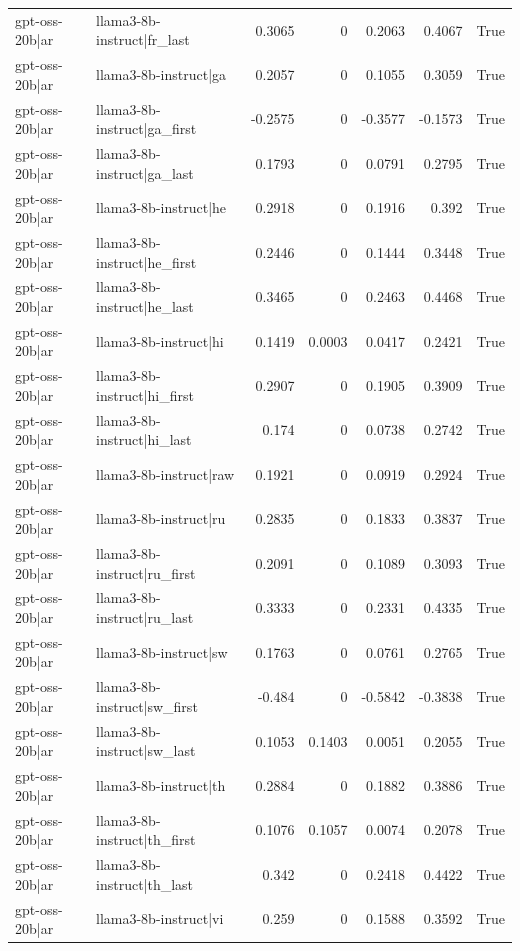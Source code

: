 \begin{table}
\begin{tabular}{l l r r r r l}
gpt-oss-20b|ar & llama3-8b-instruct|fr_last & 0.3065 & 0 & 0.2063 & 0.4067 & True \\
gpt-oss-20b|ar & llama3-8b-instruct|ga & 0.2057 & 0 & 0.1055 & 0.3059 & True \\
gpt-oss-20b|ar & llama3-8b-instruct|ga_first & -0.2575 & 0 & -0.3577 & -0.1573 & True \\
gpt-oss-20b|ar & llama3-8b-instruct|ga_last & 0.1793 & 0 & 0.0791 & 0.2795 & True \\
gpt-oss-20b|ar & llama3-8b-instruct|he & 0.2918 & 0 & 0.1916 & 0.392 & True \\
gpt-oss-20b|ar & llama3-8b-instruct|he_first & 0.2446 & 0 & 0.1444 & 0.3448 & True \\
gpt-oss-20b|ar & llama3-8b-instruct|he_last & 0.3465 & 0 & 0.2463 & 0.4468 & True \\
gpt-oss-20b|ar & llama3-8b-instruct|hi & 0.1419 & 0.0003 & 0.0417 & 0.2421 & True \\
gpt-oss-20b|ar & llama3-8b-instruct|hi_first & 0.2907 & 0 & 0.1905 & 0.3909 & True \\
gpt-oss-20b|ar & llama3-8b-instruct|hi_last & 0.174 & 0 & 0.0738 & 0.2742 & True \\
gpt-oss-20b|ar & llama3-8b-instruct|raw & 0.1921 & 0 & 0.0919 & 0.2924 & True \\
gpt-oss-20b|ar & llama3-8b-instruct|ru & 0.2835 & 0 & 0.1833 & 0.3837 & True \\
gpt-oss-20b|ar & llama3-8b-instruct|ru_first & 0.2091 & 0 & 0.1089 & 0.3093 & True \\
gpt-oss-20b|ar & llama3-8b-instruct|ru_last & 0.3333 & 0 & 0.2331 & 0.4335 & True \\
gpt-oss-20b|ar & llama3-8b-instruct|sw & 0.1763 & 0 & 0.0761 & 0.2765 & True \\
gpt-oss-20b|ar & llama3-8b-instruct|sw_first & -0.484 & 0 & -0.5842 & -0.3838 & True \\
gpt-oss-20b|ar & llama3-8b-instruct|sw_last & 0.1053 & 0.1403 & 0.0051 & 0.2055 & True \\
gpt-oss-20b|ar & llama3-8b-instruct|th & 0.2884 & 0 & 0.1882 & 0.3886 & True \\
gpt-oss-20b|ar & llama3-8b-instruct|th_first & 0.1076 & 0.1057 & 0.0074 & 0.2078 & True \\
gpt-oss-20b|ar & llama3-8b-instruct|th_last & 0.342 & 0 & 0.2418 & 0.4422 & True \\
gpt-oss-20b|ar & llama3-8b-instruct|vi & 0.259 & 0 & 0.1588 & 0.3592 & True \\

\end{tabular}
\end{table}
